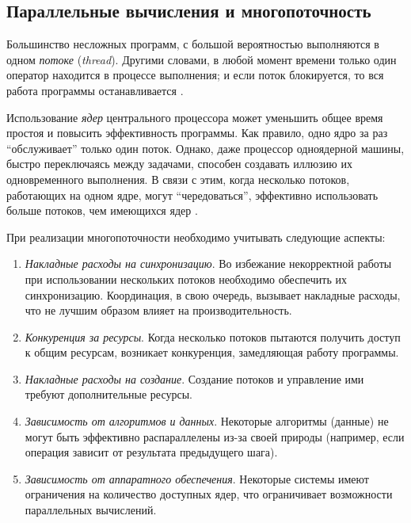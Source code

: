 \subsection{Параллельные вычисления и многопоточность}

Большинство несложных программ, с большой вероятностью выполняются в одном \textit{потоке} (\textit{thread}). Другими словами, в любой момент времени только один оператор находится в процессе выполнения; и если поток блокируется, то вся работа программы останавливается \cite{sarcar2022threading}.

Использование \textit{ядер} центрального процессора может уменьшить общее время простоя и повысить эффективность программы. Как правило, одно ядро за раз \enquote{обслуживает} только один поток. Однако, даже процессор одноядерной машины, быстро переключаясь между задачами, способен создавать иллюзию их одновременного выполнения. В связи с этим, когда несколько потоков, работающих на одном ядре, могут \enquote{чередоваться}, эффективно использовать больше потоков, чем имеющихся ядер \cite{Lee2020}.

При реализации многопоточности необходимо учитывать следующие аспекты:
\begin{enumerate}
    \item \textit{Накладные расходы на синхронизацию}. Во избежание некорректной работы при использовании нескольких потоков необходимо обеспечить их синхронизацию. Координация, в свою очередь, вызывает накладные расходы, что не лучшим образом влияет на производительность.
    \item \textit{Конкуренция за ресурсы}. Когда несколько потоков пытаются получить доступ к общим ресурсам, возникает конкуренция, замедляющая работу программы.
    \item \textit{Накладные расходы на создание}. Создание потоков и управление ими требуют дополнительные ресурсы.
    \item \textit{Зависимость от алгоритмов и данных}. Некоторые алгоритмы (данные) не могут быть эффективно распараллелены из-за своей природы (например, если операция зависит от результата предыдущего шага).
    \item \textit{Зависимость от аппаратного обеспечения}. Некоторые системы имеют ограничения на количество доступных ядер, что ограничивает возможности параллельных вычислений.
\end{enumerate}


